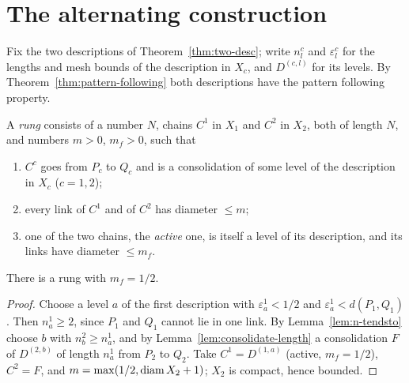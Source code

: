
\section{The alternating construction}

Fix the two descriptions of Theorem~\ref{thm:two-desc}; write $n^c_l$ and $\varepsilon^c_l$ for the lengths and mesh bounds
of the description in $X_c$, and $D^{(c,l)}$ for its levels. By Theorem~\ref{thm:pattern-following} both descriptions have the
pattern following property.

\begin{definition}\label{def:rung}
A \emph{rung} consists of a number $N$, chains $C^1$ in $X_1$ and $C^2$ in $X_2$, both of length $N$, and numbers $m>0$,
$m_f>0$, such that
\begin{enumerate}[label=(R\arabic*)]
\item $C^c$ goes from $P_c$ to $Q_c$ and is a consolidation of some level of the description in $X_c$ ($c=1,2$);
\item every link of $C^1$ and of $C^2$ has diameter $\le m$;
\item one of the two chains, the \emph{active} one, is itself a level of its description, and its links have diameter $\le m_f$.
\end{enumerate}
\end{definition}


\begin{lemma}\label{lem:base-rung}
There is a rung with $m_f=1/2$.
\end{lemma}

\begin{proof}
Choose a level $a$ of the first description with $\varepsilon^1_a<1/2$ and $\varepsilon^1_a<d(P_1,Q_1)$. Then $n^1_a\ge2$, since $P_1$
and $Q_1$ cannot lie in one link. By Lemma~\ref{lem:n-tendsto} choose $b$ with $n^2_b\ge n^1_a$, and by
Lemma~\ref{lem:consolidate-length} a consolidation $F$ of $D^{(2,b)}$ of length $n^1_a$ from $P_2$ to $Q_2$. Take $C^1=D^{(1,a)}$
(active, $m_f=1/2$), $C^2=F$, and $m=\max(1/2,\operatorname{diam} X_2+1)$; $X_2$ is compact, hence bounded.
\end{proof}

